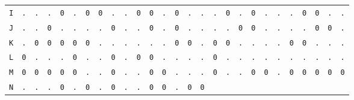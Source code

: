 \begin{figure}[H]
\begin{center}
{\begin{tabular}{c|cccccccccccccccccccccccccc}
        \texttt{I} & \texttt{.} & \texttt{.} & \texttt{.} &
        \texttt{0} & \texttt{.} & \texttt{0} & \texttt{0} &
        \texttt{.} & \texttt{.} & \texttt{0} & \texttt{0} &
        \texttt{.} & \texttt{0} & \texttt{.} & \texttt{.} &
        \texttt{.} & \texttt{0} & \texttt{.} & \texttt{0} &
        \texttt{.} & \texttt{.} & \texttt{.} & \texttt{0} &
        \texttt{0} & \texttt{.} & \texttt{.}                             \\
        \texttt{J} & \texttt{.} & \texttt{.} & \texttt{0} &
        \texttt{.} & \texttt{.} & \texttt{.} & \texttt{.} &
        \texttt{0} & \texttt{.} & \texttt{.} & \texttt{0} &
        \texttt{.} & \texttt{0} & \texttt{.} & \texttt{.} &
        \texttt{.} & \texttt{.} & \texttt{0} & \texttt{0} &
        \texttt{.} & \texttt{.} & \texttt{.} & \texttt{.} &
        \texttt{0} & \texttt{0} & \texttt{.}                             \\
        \texttt{K} & \texttt{.} & \texttt{0} & \texttt{0} &
        \texttt{0} & \texttt{0} & \texttt{0} & \texttt{.} &
        \texttt{.} & \texttt{.} & \texttt{.} & \texttt{.} &
        \texttt{.} & \texttt{0} & \texttt{0} & \texttt{.} &
        \texttt{0} & \texttt{0} & \texttt{.} & \texttt{.} &
        \texttt{.} & \texttt{.} & \texttt{0} & \texttt{0} &
        \texttt{.} & \texttt{.} & \texttt{.}                             \\
        \texttt{L} & \texttt{0} & \texttt{.} & \texttt{.} &
        \texttt{.} & \texttt{0} & \texttt{.} & \texttt{.} &
        \texttt{0} & \texttt{.} & \texttt{0} & \texttt{0} &
        \texttt{.} & \texttt{.} & \texttt{.} & \texttt{.} &
        \texttt{0} & \texttt{.} & \texttt{.} & \texttt{.} &
        \texttt{.} & \texttt{.} & \texttt{.} & \texttt{.} &
        \texttt{.} & \texttt{.} & \texttt{.}                             \\
        \texttt{M} & \texttt{0} & \texttt{0} & \texttt{0} &
        \texttt{0} & \texttt{0} & \texttt{.} & \texttt{.} &
        \texttt{0} & \texttt{.} & \texttt{.} & \texttt{0} &
        \texttt{0} & \texttt{.} & \texttt{.} & \texttt{.} &
        \texttt{0} & \texttt{.} & \texttt{.} & \texttt{0} &
        \texttt{0} & \texttt{.} & \texttt{0} & \texttt{0} &
        \texttt{0} & \texttt{0} & \texttt{0}                             \\
        \texttt{N} & \texttt{.} & \texttt{.} & \texttt{.} &
        \texttt{0} & \texttt{.} & \texttt{0} & \texttt{.} &
        \texttt{0} & \texttt{.} & \texttt{.} & \texttt{0} &
        \texttt{0} & \texttt{.} & \texttt{0} & \texttt{0} &

\end{tabular}}
\end{center}
\end{figure}
